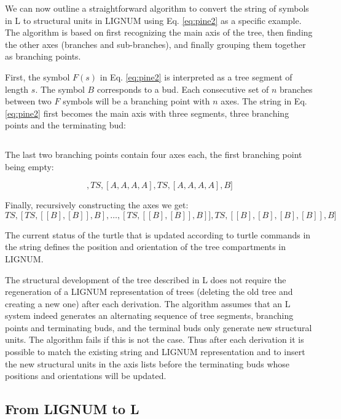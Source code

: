 We can now  outline a straightforward algorithm to  convert the string
of symbols in L to structural units in LIGNUM using Eq. \ref{eq:pine2}
as a  specific example.  The  algorithm is based on  first recognizing
the main axis  of the tree, then finding the  other axes (branches and
sub-branches), and finally grouping them together as branching points.

First, the  symbol $F(s)$ in  Eq.  \ref{eq:pine2} is interpreted  as a
tree  segment of length  $s$.  The  symbol $B$  corresponds to  a bud.
Each consecutive set of $n$ branches between two $F$ symbols will be a
branching  point with  $n$ axes.   The string  in  Eq.  \ref{eq:pine2}
first  becomes the  main  axis with  three  segments, three  branching
points and the terminating bud:

\begin{equation}
[TS, BP, TS, BP, TS, BP, B]
\end{equation}

The  last two  branching  points  contain four  axes  each, the  first
branching point being empty:

\begin{equation}
[TS, [], TS, [A,A,A,A], TS, [A,A,A,A], B]
\end{equation}

Finally, recursively constructing the axes we get:
\begin{equation}
[TS, [] TS,[TS,[[B],[B]],B],\ldots, [TS,[[B],[B]],B]], TS, [[B],[B],[B],[B]], B]
\end{equation}

The current status  of the turtle that is  updated according to turtle
commands in  the string  defines the position  and orientation  of the
tree compartments in LIGNUM.

The structural development of the tree described in L does not require
the regeneration of a LIGNUM representation of trees (deleting the old
tree and  creating a  new one) after  each derivation.   The algorithm
assumes that an  L system indeed generates an  alternating sequence of
tree segments, branching points and terminating buds, and the terminal
buds only generate new structural  units.  The algorithm fails if this
is not the  case.  Thus after each derivation it  is possible to match
the existing  string and LIGNUM  representation and to insert  the new
structural units in  the axis lists before the  terminating buds whose
positions and orientations will be updated.

\subsection{From LIGNUM to L}\label{sec:LignumToL}

